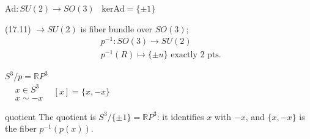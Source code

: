 $\text{Ad}:SU(2) \to SO(3)$ \quad \quad \, $\text{ker}{\text{Ad}} = \lbrace \pm 1 \rbrace$

(17.11) $\to SU(2)$ is fiber bundle over $SO(3)$; 
\[
\begin{aligned}
  & p^{-1} : SO(3) \to SU(2) \\ 
  & p^{-1}(R) \mapsto \lbrace \pm u \rbrace \text{ exactly 2 pts. }
\end{aligned}
\]


$S^3/p = \mathbb{R}P^3$ \\
$\begin{aligned}
  & x\in S^3 \\
  & x\sim -x\end{aligned}$ \quad \, $[x] = \lbrace x,-x\rbrace$

\begin{correction}{quotient}
The quotient is $S^3/\{\pm1\}=\mathbb RP^3$: it identifies $x$ with $-x$, and $\{x,-x\}$ is the fiber $p^{-1}(p(x))$.
\end{correction}
